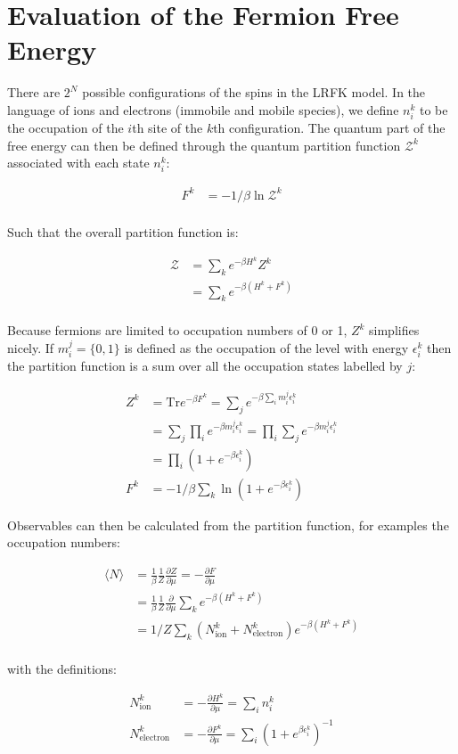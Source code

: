 \hypertarget{evaluation-of-the-fermion-free-energy}{%
\section{Evaluation of the Fermion Free Energy}\label{evaluation-of-the-fermion-free-energy}}

There are \(2^N\) possible configurations of the spins in the LRFK model. In the language of ions and electrons (immobile and mobile species), we define \(n^k_i\) to be the occupation of the \(i\)th site of the \(k\)th configuration. The quantum part of the free energy can then be defined through the quantum partition function \(\mathcal{Z}^k\) associated with each state \(n^k_i\):

\[\begin{aligned}
F^k &= -1/\beta \ln{\mathcal{Z}^k} \\
\end{aligned}\]

Such that the overall partition function is:

\[\begin{aligned}
\mathcal{Z} &= \sum_k e^{- \beta H^k} Z^k \\
&= \sum_k e^{-\beta (H^k + F^k)} \\
\end{aligned}\]

Because fermions are limited to occupation numbers of 0 or 1, \(Z^k\) simplifies nicely. If \(m^j_i = \{0,1\}\) is defined as the occupation of the level with energy \(\epsilon^k_i\) then the partition function is a sum over all the occupation states labelled by \(j\):

\[\begin{aligned}
Z^k    &= \mathrm{Tr} e^{-\beta F^k} = \sum_j e^{-\beta \sum_i m^j_i \epsilon^k_i}\\
       &= \sum_j \prod_i e^{- \beta m^j_i \epsilon^k_i}= \prod_i \sum_j e^{- \beta m^j_i \epsilon^k_i}\\
       &= \prod_i (1 + e^{- \beta \epsilon^k_i})\\
F^k    &= -1/\beta \sum_k \ln{(1 + e^{- \beta \epsilon^k_i})}
\end{aligned}\]

Observables can then be calculated from the partition function, for examples the occupation numbers:

\[\begin{aligned}
\langle N \rangle &= \frac{1}{\beta} \frac{1}{Z} \frac{\partial Z}{\partial \mu} = - \frac{\partial F}{\partial \mu}\\
    &= \frac{1}{\beta} \frac{1}{Z} \frac{\partial}{\partial \mu} \sum_k e^{-\beta (H^k + F^k)}\\
    &= 1/Z \sum_k (N^k_{\mathrm{ion}} + N^k_{\mathrm{electron}}) e^{-\beta (H^k + F^k)}\\
\end{aligned}\]

with the definitions:

\[\begin{aligned}
N^k_{\mathrm{ion}} &= - \frac{\partial H^k}{\partial \mu} = \sum_i n^k_i\\
N^k_{\mathrm{electron}} &= - \frac{\partial F^k}{\partial \mu} = \sum_i \left(1 + e^{\beta \epsilon^k_i}\right)^{-1}\\
\end{aligned}\]
